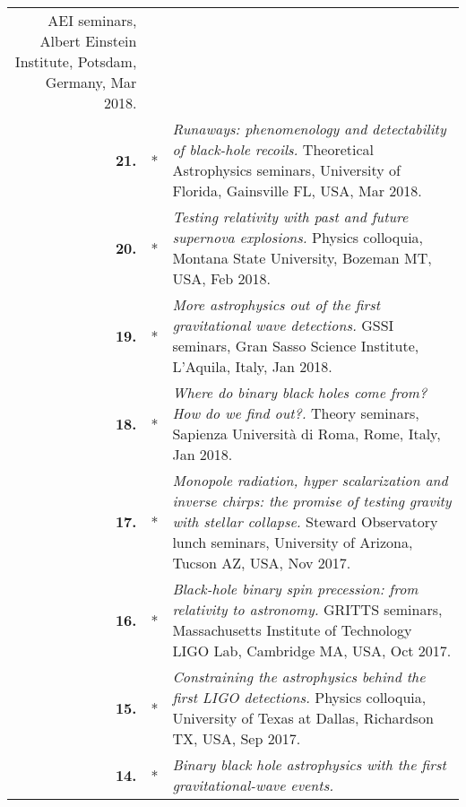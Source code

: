 {\begin{longtable}{rp{0.3cm}p{15.8cm}}
\newline{}
AEI seminars, Albert Einstein Institute, Potsdam, Germany, Mar 2018.
\vspace{0.05cm}\\
%
\textbf{21.} & * & \textit{Runaways: phenomenology and detectability of black-hole recoils.}
\newline{}
Theoretical Astrophysics seminars, University of Florida, Gainsville FL, USA, Mar 2018.
\vspace{0.05cm}\\
%
\textbf{20.} & * & \textit{Testing relativity with past and future supernova explosions.}
\newline{}
Physics colloquia, Montana State University, Bozeman MT, USA, Feb 2018.
\vspace{0.05cm}\\
%
\textbf{19.} & * & \textit{More astrophysics out of the first gravitational wave detections.}
\newline{}
GSSI seminars, Gran Sasso Science Institute, L'Aquila, Italy, Jan 2018.
\vspace{0.05cm}\\
%
\textbf{18.} & * & \textit{Where do binary black holes come from? How do we find out?.}
\newline{}
Theory seminars, Sapienza Universit\`a di Roma, Rome, Italy, Jan 2018.
\vspace{0.05cm}\\
%
\textbf{17.} & * & \textit{Monopole radiation, hyper scalarization and inverse chirps: the promise of testing gravity with stellar collapse.}
\newline{}
Steward Observatory lunch seminars, University of Arizona, Tucson AZ, USA, Nov 2017.
\vspace{0.05cm}\\
%
\textbf{16.} & * & \textit{Black-hole binary spin precession: from relativity to astronomy.}
\newline{}
GRITTS seminars, Massachusetts Institute of Technology LIGO Lab, Cambridge MA, USA, Oct 2017.
\vspace{0.05cm}\\
%
\textbf{15.} & * & \textit{Constraining the astrophysics behind the first LIGO detections.}
\newline{}
Physics colloquia, University of Texas at Dallas, Richardson TX, USA, Sep 2017.
\vspace{0.05cm}\\
%
\textbf{14.} & * & \textit{Binary black hole astrophysics with the first gravitational-wave events.}

\end{longtable}}
